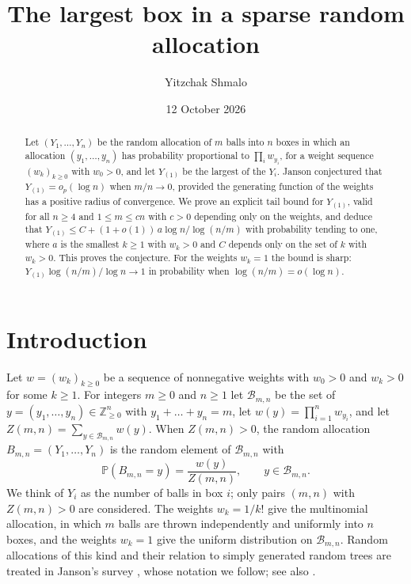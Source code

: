 \documentclass[11pt]{amsart}
\title[The largest box in a sparse random allocation]{The largest box in a sparse random allocation}
\author{Yitzchak Shmalo}
\date{12 October 2026}
\theoremstyle{remark}
\numberwithin{equation}{section}
\newcommand{\Pp}{\mathbb P}
\newcommand{\Z}{\mathbb Z}
\newcommand{\cB}{\mathcal B}
\begin{document}
\begin{abstract}
Let $(Y_1,\dots,Y_n)$ be the random allocation of $m$ balls into $n$ boxes in which an allocation $(y_1,\dots,y_n)$ has probability proportional to $\prod_iw_{y_i}$, for a weight sequence $(w_k)_{k\ge0}$ with $w_0>0$, and let $Y_{(1)}$ be the largest of the $Y_i$. Janson conjectured that $Y_{(1)}=o_p(\log n)$ when $m/n\to0$, provided the generating function of the weights has a positive radius of convergence. We prove an explicit tail bound for $Y_{(1)}$, valid for all $n\ge4$ and $1\le m\le cn$ with $c>0$ depending only on the weights, and deduce that $Y_{(1)}\le C+(1+o(1))\,a\log n/\log(n/m)$ with probability tending to one, where $a$ is the smallest $k\ge1$ with $w_k>0$ and $C$ depends only on the set of $k$ with $w_k>0$. This proves the conjecture. For the weights $w_k=1$ the bound is sharp: $Y_{(1)}\log(n/m)/\log n\to1$ in probability when $\log(n/m)=o(\log n)$.
\end{abstract}
\maketitle

\section{Introduction}\label{sec:intro}

Let $w=(w_k)_{k\ge0}$ be a sequence of nonnegative weights with $w_0>0$ and $w_k>0$ for some $k\ge1$. For integers $m\ge0$ and $n\ge1$ let $\cB_{m,n}$ be the set of $y=(y_1,\dots,y_n)\in\Z_{\ge0}^n$ with $y_1+\dots+y_n=m$, let $w(y)=\prod_{i=1}^nw_{y_i}$, and let $Z(m,n)=\sum_{y\in\cB_{m,n}}w(y)$. When $Z(m,n)>0$, the random allocation $B_{m,n}=(Y_1,\dots,Y_n)$ is the random element of $\cB_{m,n}$ with
\begin{equation}\label{eq:law}
\Pp(B_{m,n}=y)=\frac{w(y)}{Z(m,n)},\qquad y\in\cB_{m,n}.
\end{equation}
We think of $Y_i$ as the number of balls in box $i$; only pairs $(m,n)$ with $Z(m,n)>0$ are considered. The weights $w_k=1/k!$ give the multinomial allocation, in which $m$ balls are thrown independently and uniformly into $n$ boxes, and the weights $w_k=1$ give the uniform distribution on $\cB_{m,n}$. Random allocations of this kind and their relation to simply generated random trees are treated in Janson's survey \cite{J12}, whose notation we follow; see also \cite{KSC78,Pav00}.
\end{document}
